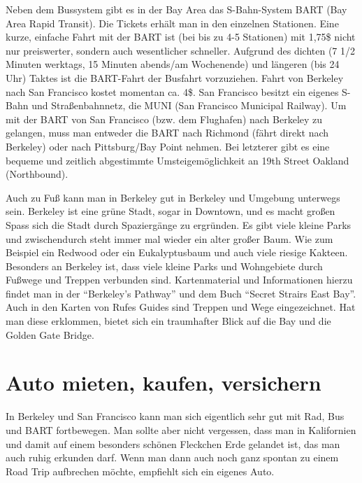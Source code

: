 \documentclass[a4paper]{scrreprt}
\begin{document}
Neben dem Bussystem gibt es in der Bay Area das S-Bahn-System BART
(Bay Area Rapid Transit). Die Tickets erhält man in den einzelnen
Stationen. Eine kurze, einfache Fahrt mit der BART ist (bei bis zu 4-5
Stationen) mit 1,75\$ nicht nur preiswerter, sondern auch
wesentlicher schneller. Aufgrund des dichten (7 1/2 Minuten werktags,
15 Minuten abends/am Wochenende) und längeren (bis 24 Uhr) Taktes ist
die BART-Fahrt der Busfahrt vorzuziehen. Fahrt von Berkeley nach San
Francisco kostet momentan ca. 4\$. San Francisco besitzt ein eigenes
S-Bahn und Straßenbahnnetz, die MUNI (San Francisco Municipal
Railway). Um mit der BART von San Francisco (bzw. dem Flughafen) nach
Berkeley zu gelangen, muss man entweder die BART nach Richmond (fährt
direkt nach Berkeley) oder nach Pittsburg/Bay Point nehmen. Bei
letzterer gibt es eine bequeme und zeitlich abgestimmte
Umsteigemöglichkeit an 19th Street Oakland (Northbound).

Auch zu Fuß kann man in Berkeley gut in Berkeley und Umgebung
unterwegs sein. Berkeley ist eine grüne Stadt, sogar in Downtown, und
es macht großen Spass sich die Stadt durch  
Spaziergänge zu ergründen. Es gibt viele kleine Parks und
zwischendurch steht immer mal wieder ein alter großer Baum. Wie
zum Beispiel ein Redwood oder ein Eukalyptusbaum und auch viele
riesige Kakteen. %
Besonders an Berkeley ist, dass viele kleine Parks und Wohngebiete
durch Fußwege und Treppen verbunden sind. Kartenmaterial und
Informationen hierzu findet man in der ``Berkeley's Pathway'' und dem
Buch ``Secret Strairs East Bay''. Auch in den Karten von Rufes Guides
sind Treppen und Wege eingezeichnet. Hat man diese erklommen, bietet
sich ein traumhafter Blick auf die Bay und die Golden Gate
Bridge.

\section{Auto mieten, kaufen, versichern}

In Berkeley und San Francisco kann man sich eigentlich sehr gut mit Rad, Bus und BART fortbewegen. Man sollte aber nicht vergessen, dass man in Kalifornien und damit auf einem besonders schönen Fleckchen Erde gelandet ist, das man auch ruhig erkunden darf. Wenn man dann auch noch ganz spontan zu einem Road Trip aufbrechen möchte, empfiehlt sich ein eigenes Auto.
\end{document}
